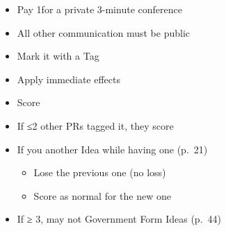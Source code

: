 \documentclass[10pt]{article}
\begin{document}
\begin{itemize}
	\item Pay 1\diplopower for a private 3-minute conference
	\item All other communication must be public
\end{itemize}

\begin{itemize}
	\item Mark it with a Tag
	\item Apply immediate effects
	\item Score 
	\item If ≤2 other PRs tagged it, they score 
	\item If you  another  Idea while having one (p.~21)
	\begin{itemize}
		\item Lose the previous one (no \prestige loss)
		\item Score \prestige as normal for the new one
	\end{itemize}
	\item If \authority ≥ 3,  may not  Government Form Ideas (p.~44)
\end{itemize}
\end{document}
